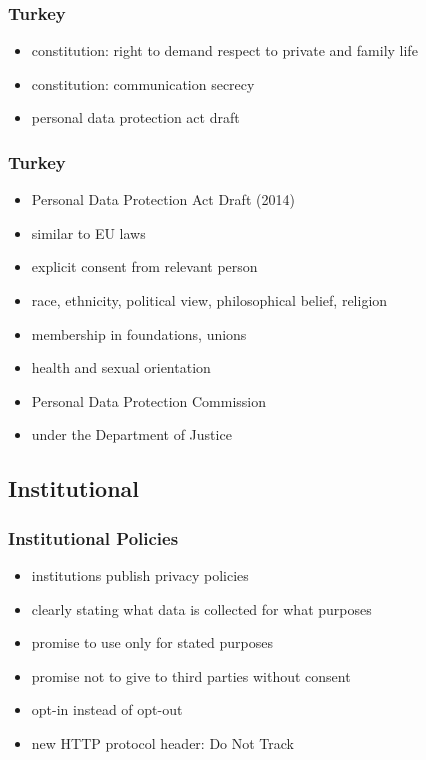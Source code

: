\documentclass[dvipsnames]{beamer}
\theoremstyle{plain}
\begin{document}
\begin{frame}
  \frametitle{Turkey}

  \begin{itemize}
    \item constitution: right to demand respect to private and family life
    \item constitution: communication secrecy
    \item personal data protection act draft
  \end{itemize}
\end{frame}

\begin{frame}
  \frametitle{Turkey}

  \begin{itemize}
    \item Personal Data Protection Act Draft (2014)
    \smallskip
    \item similar to EU laws
    \item explicit consent from relevant person

    \smallskip
    \item race, ethnicity, political view, philosophical belief, religion
    \item membership in foundations, unions
    \item health and sexual orientation

    \smallskip
    \item Personal Data Protection Commission
    \item under the Department of Justice
  \end{itemize}
\end{frame}

\subsection{Institutional}

\begin{frame}
  \frametitle{Institutional Policies}

  \begin{itemize}
    \item institutions publish privacy policies
    \item clearly stating what data is collected for what purposes
    \item promise to use only for stated purposes
    \item promise not to give to third parties without consent

    \medskip
    \item opt-in instead of opt-out

    \medskip
    \item new HTTP protocol header: Do Not Track
  \end{itemize}
\end{frame}
\end{document}
